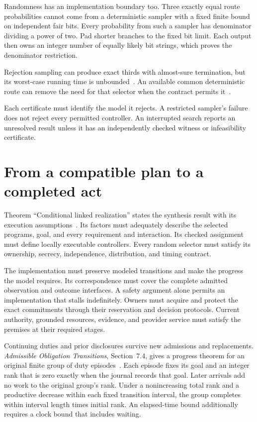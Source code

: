 \documentclass{momentum}
\begin{document}
Randomness has an implementation boundary too.
Three exactly equal route probabilities cannot come from a deterministic sampler with a fixed finite bound on independent fair bits.
Every probability from such a sampler has denominator dividing a power of two.
Pad shorter branches to the fixed bit limit.
Each output then owns an integer number of equally likely bit strings, which proves the denominator restriction.

Rejection sampling can produce exact thirds with almost-sure termination, but its worst-case running time is unbounded~\cite[Section~18]{linking}.
An available common deterministic route can remove the need for that selector when the contract permits it~\cite[Section~23]{linking}.

Each certificate must identify the model it rejects.
A restricted sampler's failure does not reject every permitted controller.
An interrupted search reports an unresolved result unless it has an independently checked witness or infeasibility certificate.

\section{From a compatible plan to a completed act}
\label{sec:realization}

Theorem ``Conditional linked realization'' states the synthesis result with its execution assumptions~\cite[Section~25]{linking}.
Its factors must adequately describe the selected programs, goal, and every requirement and interaction.
Its checked assignment must define locally executable controllers.
Every random selector must satisfy its ownership, secrecy, independence, distribution, and timing contract.

The implementation must preserve modeled transitions and make the progress the model requires.
Its correspondence must cover the complete admitted observation and outcome interfaces.
A safety argument alone permits an implementation that stalls indefinitely.
Owners must acquire and protect the exact commitments through their reservation and decision protocols.
Current authority, grounded resources, evidence, and provider service must satisfy the premises at their required stages.

Continuing duties and prior disclosures survive new admissions and replacements.
\emph{Admissible Obligation Transitions}, Section~7.4, gives a progress theorem for an original finite group of duty episodes~\cite{transitions}.
Each episode fixes its goal and an integer rank that is zero exactly when the journal records that goal.
Later arrivals add no work to the original group's rank.
Under a nonincreasing total rank and a productive decrease within each fixed transition interval, the group completes within interval length times initial rank.
An elapsed-time bound additionally requires a clock bound that includes waiting.
\end{document}
